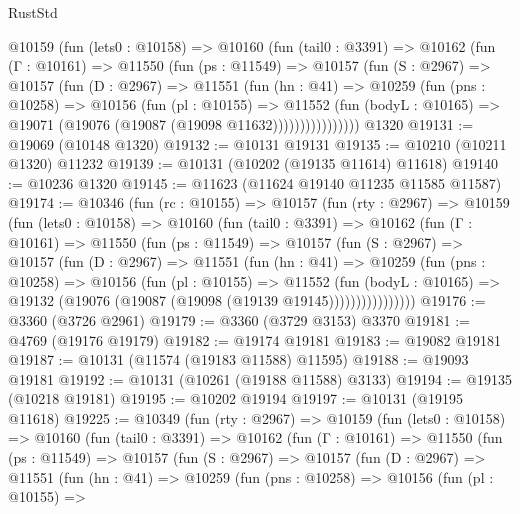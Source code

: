 \begin{lexlean}{RustStd}
\begin{coremodule}
        @10159
          (fun (lets0 : @10158) =>
          @10160
            (fun (tail0 : @3391) =>
            @10162
              (fun (Γ : @10161) =>
              @11550
                (fun (ps : @11549) =>
                @10157
                  (fun (S : @2967) =>
                  @10157
                    (fun (D : @2967) =>
                    @11551
                      (fun (hn : @41) =>
                      @10259
                        (fun (pns : @10258) =>
                        @10156
                          (fun (pl : @10155) =>
                          @11552
                            (fun (bodyL : @10165) =>
                            @19071 (@19076 (@19087 (@19098 @11632))))))))))))))))
    @1320
@19131 := @19069 (@10148 @1320)
@19132 := @10131 @19131
@19135 := @10210 (@10211 @1320) @11232
@19139 := @10131 (@10202 (@19135 @11614) @11618)
@19140 := @10236 @1320
@19145 := @11623 (@11624 @19140 @11235 @11585 @11587)
@19174 := @10346
    (fun (rc : @10155) =>
    @10157
      (fun (rty : @2967) =>
      @10159
        (fun (lets0 : @10158) =>
        @10160
          (fun (tail0 : @3391) =>
          @10162
            (fun (Γ : @10161) =>
            @11550
              (fun (ps : @11549) =>
              @10157
                (fun (S : @2967) =>
                @10157
                  (fun (D : @2967) =>
                  @11551
                    (fun (hn : @41) =>
                    @10259
                      (fun (pns : @10258) =>
                      @10156
                        (fun (pl : @10155) =>
                        @11552
                          (fun (bodyL : @10165) =>
                          @19132 (@19076 (@19087 (@19098 (@19139 @19145))))))))))))))))
@19176 := @3360 (@3726 @2961)
@19179 := @3360 (@3729 @3153) @3370
@19181 := @4769 (@19176 @19179)
@19182 := @19174 @19181
@19183 := @19082 @19181
@19187 := @10131 (@11574 (@19183 @11588) @11595)
@19188 := @19093 @19181
@19192 := @10131 (@10261 (@19188 @11588) @3133)
@19194 := @19135 (@10218 @19181)
@19195 := @10202 @19194
@19197 := @10131 (@19195 @11618)
@19225 := @10349
    (fun (rty : @2967) =>
    @10159
      (fun (lets0 : @10158) =>
      @10160
        (fun (tail0 : @3391) =>
        @10162
          (fun (Γ : @10161) =>
          @11550
            (fun (ps : @11549) =>
            @10157
              (fun (S : @2967) =>
              @10157
                (fun (D : @2967) =>
                @11551
                  (fun (hn : @41) =>
                  @10259
                    (fun (pns : @10258) =>
                    @10156
                      (fun (pl : @10155) =>

\end{coremodule}
\end{lexlean}
